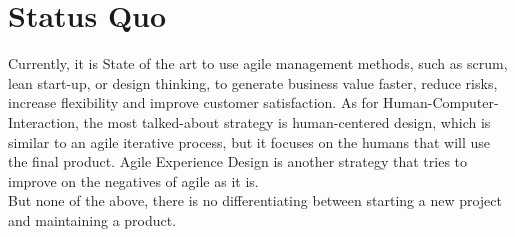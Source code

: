 \section*{Status Quo}

Currently, it is State of the art to use agile management methods, such as scrum, lean start-up, or design thinking, to generate business value faster, reduce risks, increase flexibility and improve customer satisfaction. As for Human-Computer-Interaction, the most talked-about strategy is human-centered design, which is similar to an agile iterative process, but it focuses on the humans that will use the final product. Agile Experience Design is another strategy that tries to improve on the negatives of agile as it is. \\
But none of the above, there is no differentiating between starting a new project and maintaining a product. 